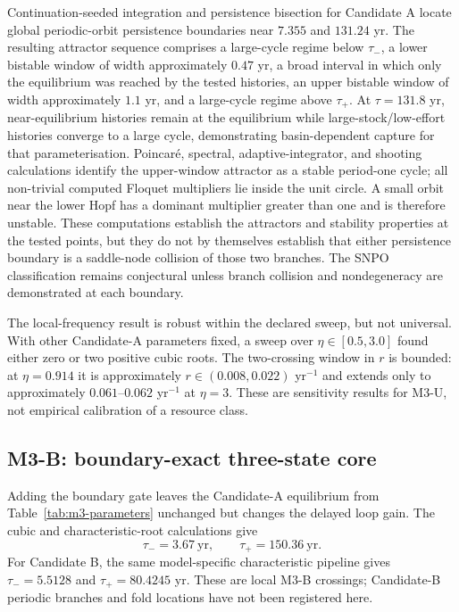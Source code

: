 \documentclass[11pt]{article}
\begin{document}
Continuation-seeded integration and persistence bisection for Candidate A locate global periodic-orbit persistence boundaries near $7.355$ and $131.24$ yr. The resulting attractor sequence comprises a large-cycle regime below $\tau_-$, a lower bistable window of width approximately $0.47$ yr, a broad interval in which only the equilibrium was reached by the tested histories, an upper bistable window of width approximately $1.1$ yr, and a large-cycle regime above $\tau_+$. At $\tau=131.8$ yr, near-equilibrium histories remain at the equilibrium while large-stock/low-effort histories converge to a large cycle, demonstrating basin-dependent capture for that parameterisation. Poincar\'e, spectral, adaptive-integrator, and shooting calculations identify the upper-window attractor as a stable period-one cycle; all non-trivial computed Floquet multipliers lie inside the unit circle. A small orbit near the lower Hopf has a dominant multiplier greater than one and is therefore unstable. These computations establish the attractors and stability properties at the tested points, but they do not by themselves establish that either persistence boundary is a saddle-node collision of those two branches. The SNPO classification remains conjectural unless branch collision and nondegeneracy are demonstrated at each boundary.

The local-frequency result is robust within the declared sweep, but not universal. With other Candidate-A parameters fixed, a sweep over $\eta\in[0.5,3.0]$ found either zero or two positive cubic roots. The two-crossing window in $r$ is bounded: at $\eta=0.914$ it is approximately $r\in(0.008,0.022)$ yr$^{-1}$ and extends only to approximately $0.061$--$0.062$ yr$^{-1}$ at $\eta=3$. These are sensitivity results for M3-U, not empirical calibration of a resource class.

\subsection{M3-B: boundary-exact three-state core}

Adding the boundary gate leaves the Candidate-A equilibrium from Table~\ref{tab:m3-parameters} unchanged but changes the delayed loop gain. The cubic and characteristic-root calculations give
\[
\tau_-=3.67\ \text{yr},\qquad \tau_+=150.36\ \text{yr}.
\]
For Candidate B, the same model-specific characteristic pipeline gives $\tau_-=5.5128$ and $\tau_+=80.4245$ yr. These are local M3-B crossings; Candidate-B periodic branches and fold locations have not been registered here.
\end{document}
